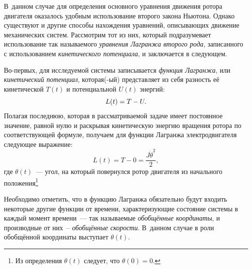 \documentclass[12pt,a4paper,openany]{extarticle}
\begin{document}
В~данном случае для определения основного уравнения движения ротора двигателя оказалось удобным использование второго закона Ньютона. 
Однако существуют и другие способы нахождения уравнений, описывающих движение механических систем.
Рассмотрим тот из них, который подразумевает использование так называемого {\itshape уравнения Лагранжа второго рода}, записанного с использованием \textit{кинетического потенциала}, и заключается в следующем.

Во-первых, для исследуемой системы записывается {\itshape функция Лагранжа}, или \textit{кинетический потенциал}, которая(-ый) представляет из себя разность её кинетической $T(t)$ и потенциальной $U(t)$ энергий:
\begin{equation}\label{just_lagr}
	L(t) = T - U\ldotp
\end{equation}
Полагая последнюю, которая в рассматриваемой задаче имеет постоянное значение, равной нулю и раскрывая кинетическую энергию вращения ротора по соответствующей формуле, получаем для функции Лагранжа электродвигателя следующее выражение:
\begin{equation}\label{lagr_with_kinet}
	L(t) = T - 0 = \frac{J\dot{\theta}^2}{2}, 
\end{equation}
где $\theta(t)$~--- угол, на который повернулся ротор двигателя из начального положения\footnote{Из определения $\theta(t)$ следует, что $\theta(0) = 0$.}

Необходимо отметить, что в функцию Лагранжа обязательно будут входить некоторые другие функции от времени, характеризующие состояние системы в каждый момент времени~--- так называемые {\itshape обобщённые координаты}, и производные от них~-- {\itshape обобщённые скорости}. 
В~данном случае в роли обобщённой координаты выступает $\theta(t)$.
\end{document}

